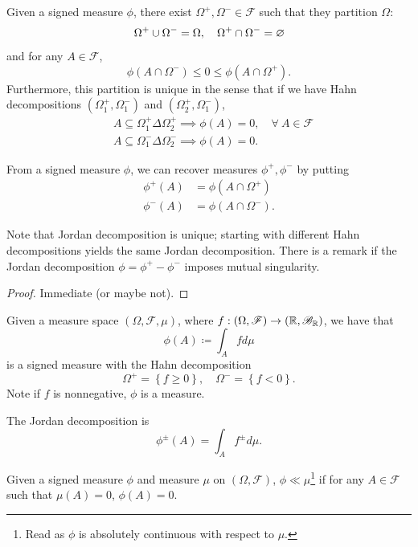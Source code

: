 \begin{theorem}
	Given a signed measure $\phi$, there exist $\Omega^+, \Omega^- \in \mathscr{F}$ such that they partition $\Omega$: \[
		\Omega^+ \cup \Omega^- = \Omega, \quad \Omega^+ \cap \Omega^- = \varnothing
	\] and for any $A \in \mathscr{F}$, \[
		\phi(A \cap \Omega^-) \le 0 \le \phi(A \cap \Omega^+)
	.\] 
	Furthermore, this partition is unique in the sense that if we have Hahn decompositions $\left( \Omega_1^+, \Omega_1^- \right)$ and $\left( \Omega_2^+, \Omega_1^- \right)$,
	\begin{align*}
		&A \subseteq \Omega_1^+ \Delta \Omega_2^+ \implies \phi(A) = 0, \quad \forall\ A \in \mathscr{F} \\
		&A \subseteq \Omega_1^- \Delta \Omega_2^- \implies \phi(A) = 0
	.\end{align*}
\end{theorem}

\begin{proposition}
	From a signed measure $\phi$, we can recover measures $\phi^+,\phi^-$ by putting
	\begin{align*}
		\phi^+(A) &= \phi(A \cap \Omega^+) \\
		\phi^-(A) &= \phi(A \cap \Omega^-)
	.\end{align*}

	Note that Jordan decomposition is unique; starting with different Hahn decompositions yields the same Jordan decomposition.
	There is a remark if the Jordan decomposition $\phi = \phi^+ - \phi^-$ imposes mutual singularity.
\end{proposition}
\begin{proof}
	Immediate (or maybe not).
\end{proof}

\begin{example}
	Given a measure space $\left( \Omega, \mathscr{F}, \mu \right)$, where $f: \left( \Omega, \mathscr{F} \right)\to \left( \mathbb{R},\mathscr{B}_{\mathbb{R}} \right)$, we have that \[
		\phi(A) \coloneqq \int_A fd\mu
	\] is a signed measure with the Hahn decomposition \[
		\Omega^+ = \left\{f \ge 0\right\}, \quad \Omega^- = \left\{f < 0\right\}
	.\] 
	Note if $f$ is nonnegative, $\phi$ is a measure. 

	The Jordan decomposition is \[
		\phi^{\pm}(A) = \int_A f^{\pm}d\mu
	.\] 
\end{example}

\begin{definition}
	Given a signed measure $\phi$ and measure $\mu$ on $(\Omega, \mathscr{F})$, $\phi \ll \mu$\footnote{Read as $\phi$ is absolutely continuous with respect to $\mu$.} if for any $A \in \mathscr{F}$ such that $\mu(A) = 0$, $\phi(A) = 0$.
\end{definition}

